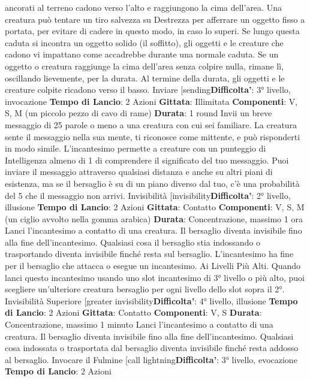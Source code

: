 \begin{multicols}{2}
ancorati al terreno cadono verso l’alto e raggiungono la
cima dell’area. Una creatura può tentare un tiro
salvezza su Destrezza per afferrare un oggetto fisso a
portata, per evitare di cadere in questo modo, in caso lo
superi.
Se lungo questa caduta si incontra un oggetto solido (il
soffitto), gli oggetti e le creature che cadono vi
impattano come accadrebbe durante una normale
caduta. Se un oggetto o creatura raggiunge la cima
dell’area senza colpire nulla, rimane lì, oscillando
lievemente, per la durata.
Al termine della durata, gli oggetti e le creature colpite
ricadono verso il basso.
Inviare
[sending\textbf{Difficolta'}:
3° livello, invocazione
\textbf{Tempo di Lancio}: 2 Azioni
\textbf{Gittata}: Illimitata
\textbf{Componenti}: V, S, M (un piccolo pezzo di cavo di
rame)
\textbf{Durata}: 1 round
Invii un breve messaggio di 25 parole o meno a una
creatura con cui sei familiare. La creatura sente il
messaggio nella sua mente, ti riconosce come mittente,
e può risponderti in modo simile. L’incantesimo
permette a creature con un punteggio di Intelligenza
almeno di 1 di comprendere il significato del tuo
messaggio.
Puoi inviare il messaggio attraverso qualsiasi distanza e
anche su altri piani di esistenza, ma se il bersaglio è su
di un piano diverso dal tuo, c’è una probabilità del 5%
che il messaggio non arrivi.
Invisibilità
[invisibility\textbf{Difficolta'}:
2° livello, illusione
\textbf{Tempo di Lancio}: 2 Azioni
\textbf{Gittata}: Contatto
\textbf{Componenti}: V, S, M (un ciglio avvolto nella gomma
arabica)
\textbf{Durata}: Concentrazione, massimo 1 ora
Lanci l’incantesimo a contatto di una creatura. Il
bersaglio diventa invisibile fino alla fine
dell’incantesimo. Qualsiasi cosa il bersaglio stia
indossando o trasportando diventa invisibile finché
resta sul bersaglio. L’incantesimo ha fine per il
bersaglio che attacca o esegue un incantesimo.
Ai Livelli Più Alti. Quando lanci questo incantesimo
usando uno slot incantesimo di 3° livello o più alto, puoi
scegliere un’ulteriore creatura bersaglio per ogni livello
dello slot sopra il 2°.
Invisibilità Superiore
[greater invisibility\textbf{Difficolta'}:
4° livello, illusione
\textbf{Tempo di Lancio}: 2 Azioni
\textbf{Gittata}: Contatto
\textbf{Componenti}: V, S
\textbf{Durata}: Concentrazione, massimo 1 minuto
Lanci l’incantesimo a contatto di una creatura. Il
bersaglio diventa invisibile fino alla fine
dell’incantesimo. Qualsiasi cosa indossata o trasportata
dal bersaglio diventa invisibile finché resta addosso al
bersaglio.
Invocare il Fulmine
[call lightning\textbf{Difficolta'}:
3° livello, evocazione
\textbf{Tempo di Lancio}: 2 Azioni

\end{multicols}
